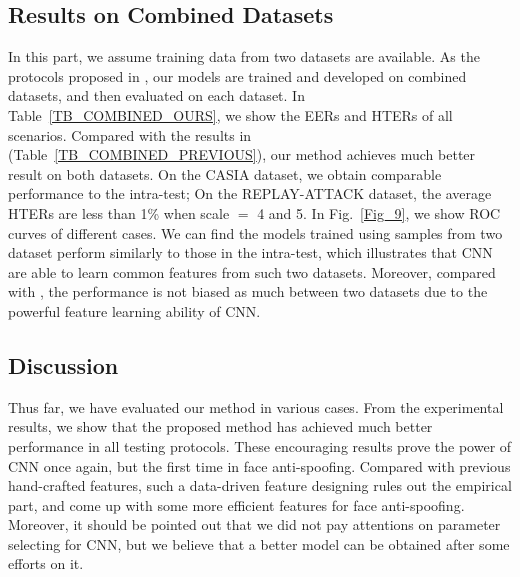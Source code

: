 \documentclass[letterpaper, 10 pt, conference]{ieeeconf}
\begin{document}
\subsection{Results on Combined Datasets}

In this part, we assume training data from two datasets are available. As the protocols proposed in \cite{Face_Anti_Spoofing_Pereira_2013}, our models are trained and developed on combined datasets, and then evaluated on each dataset. In Table~\ref{TB_COMBINED_OURS}, we show the EERs and HTERs of all scenarios. Compared with the results in \cite{Face_Anti_Spoofing_Pereira_2013} (Table~\ref{TB_COMBINED_PREVIOUS}), our method achieves much better result on both datasets. On the CASIA dataset, we obtain comparable performance to the intra-test; On the REPLAY-ATTACK dataset, the average HTERs are less than 1\% when scale $=$ 4 and 5. In Fig.~\ref{Fig_9}, we show ROC curves of different cases. We can find the models trained using samples from two dataset perform similarly to those in the intra-test, which illustrates that CNN are able to learn common features from such two datasets. Moreover, compared with \cite{Face_Anti_Spoofing_Pereira_2013}, the performance is not biased as much between two datasets due to the powerful feature learning ability of CNN.

\subsection{Discussion}

Thus far, we have evaluated our method in various cases. From the experimental results, we show that the proposed method has achieved much better performance in all testing protocols. These encouraging results prove the power of CNN once again, but the first time in face anti-spoofing. Compared with previous hand-crafted features, such a data-driven feature designing rules out the empirical part, and come up with some more efficient features for face anti-spoofing. Moreover, it should be pointed out that we did not pay attentions on parameter selecting for CNN, but we believe that a better model can be obtained after some efforts on it. 
\end{document}
